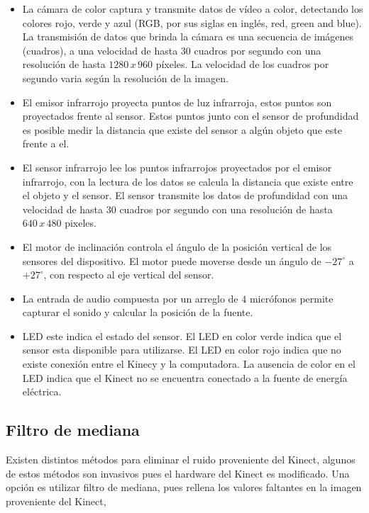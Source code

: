 \begin{itemize}
\item La cámara de color captura y transmite datos de vídeo a color, detectando los colores rojo, verde y azul (RGB, por sus siglas en ingl\'es, red, green and blue). La transmisión de datos que brinda la cámara es una secuencia de imágenes (cuadros), a una velocidad de hasta $30$ cuadros por segundo con una resolución de hasta $1280\, x \, 960$ p\'ixeles. La velocidad de los cuadros por segundo varia según la resolución de la imagen.

\item El emisor infrarrojo proyecta puntos de luz infrarroja, estos puntos son proyectados frente al sensor. Estos puntos junto con el sensor de profundidad es posible medir la distancia que existe del sensor a algún objeto que este frente a el.  

\item El sensor infrarrojo lee los puntos infrarrojos proyectados por el emisor infrarrojo, con la lectura de los datos se calcula la distancia que existe entre el objeto y el sensor. El sensor transmite los datos de profundidad con una velocidad de hasta $30$ cuadros por segundo con una resolución de hasta $640 \, x \, 480$ pixeles.   

\item El motor de inclinación controla el \'angulo de la posición vertical de los sensores del dispositivo. El motor puede moverse desde un \'angulo de $-27^ \circ$ a $+27^\circ$, con respecto al eje vertical del sensor.  

\item La entrada de audio compuesta por un arreglo de  $4$ micrófonos permite capturar el sonido y calcular la posición de la fuente.

\item LED este indica el estado del sensor. El LED en color verde indica que el sensor esta disponible para utilizarse. El LED en color rojo indica que no existe conexión entre el Kinecy y la computadora. La ausencia de color en el LED indica que el Kinect no se encuentra conectado a la fuente de energía eléctrica.
\end{itemize}

\subsection{Filtro de mediana} 

Existen distintos métodos para eliminar el ruido proveniente del Kinect, algunos de estos métodos son invasivos pues el hardware del Kinect es modificado. Una opción es utilizar filtro de mediana, pues rellena los valores faltantes en la imagen proveniente del Kinect, 

